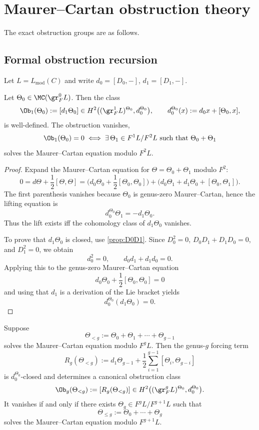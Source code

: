 \section{Maurer--Cartan obstruction theory}
\label{sec:mc-obstruction-theory}

The exact obstruction groups are as follows.

\subsection{Formal obstruction recursion}

Let $L=L_{\mathrm{mod}}(C)$ and write $d_0=[D_0,-]$, $d_1=[D_1,-]$.

\begin{theorem}\label{thm:Ob1}
Let $\Theta_0\in \MC(\gr_F^0L)$. Then the class
\[
\Ob_1(\Theta_0):=[d_1\Theta_0]
\in
H^2\big((\gr_F^1L)^{\Theta_0},d_0^{\Theta_0}\big),
\qquad
d_0^{\Theta_0}(x):=d_0x+[\Theta_0,x],
\]
is well-defined. The obstruction vanishes,
\[
\Ob_1(\Theta_0)=0
\iff
\exists\,\Theta_1\in F^1L/F^2L
\text{ such that }
\Theta_0+\Theta_1
\]
solves the Maurer--Cartan equation modulo $F^2L$.
\end{theorem}

\begin{proof}
Expand the Maurer--Cartan equation for $\Theta=\Theta_0+\Theta_1$ modulo $F^2$:
\[
0=d\Theta+\frac12[\Theta,\Theta]
=
\Big(d_0\Theta_0+\frac12[\Theta_0,\Theta_0]\Big)
+
\Big(d_0\Theta_1+d_1\Theta_0+[\Theta_0,\Theta_1]\Big).
\]
The first parenthesis vanishes because $\Theta_0$ is genus-zero Maurer--Cartan, hence the
lifting equation is
\[
d_0^{\Theta_0}\Theta_1=-d_1\Theta_0.
\]
Thus the lift exists iff the cohomology class of $d_1\Theta_0$ vanishes.

To prove that $d_1\Theta_0$ is closed, use \cref{prop:D0D1}. Since $D_0^2=0$,
$D_0D_1+D_1D_0=0$, and $D_1^2=0$, we obtain
\[
d_0^2=0,\qquad d_0d_1+d_1d_0=0.
\]
Applying this to the genus-zero Maurer--Cartan equation
\[
d_0\Theta_0+\frac12[\Theta_0,\Theta_0]=0
\]
and using that $d_1$ is a derivation of the Lie bracket yields
\[
d_0^{\Theta_0}(d_1\Theta_0)=0.
\]
\end{proof}

\begin{theorem}\label{thm:Obg}
Suppose
\[
\Theta_{<g}:=\Theta_0+\Theta_1+\cdots+\Theta_{g-1}
\]
solves the Maurer--Cartan equation modulo $F^gL$. Then the genus-$g$ forcing term
\[
R_g(\Theta_{<g})
:=
d_1\Theta_{g-1}
+\frac12\sum_{i=1}^{g-1}[\Theta_i,\Theta_{g-i}]
\]
is $d_0^{\Theta_0}$-closed and determines a canonical obstruction class
\[
\Ob_g(\Theta_{<g})
:=
[R_g(\Theta_{<g})]
\in
H^2\big((\gr_F^gL)^{\Theta_0},d_0^{\Theta_0}\big).
\]
It vanishes if and only if there exists $\Theta_g\in F^gL/F^{g+1}L$ such that
\[
\Theta_{\le g}:=\Theta_0+\cdots+\Theta_g
\]
solves the Maurer--Cartan equation modulo $F^{g+1}L$.
\end{theorem}

